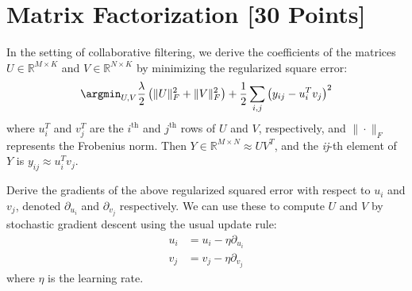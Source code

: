 \newpage
\section{Matrix Factorization [30 Points]}

In the setting of collaborative filtering, we derive the coefficients of the matrices $U \in \mathbb{R}^{M \times K}$ and $V \in \mathbb{R}^{N \times K}$ by minimizing the regularized square error:
$$\argmin_{U,V} \frac{\lambda}{2} \left( \|U\|_F^2 + \|V\|^2_F \right) + \frac{1}{2}\sum_{i,j} \left( y_{ij} - u_i^Tv_j\right)^2$$
where $u_i^T$ and $v_j^T$ are the $i^{\text{th}}$ and $j^{\text{th}}$ rows of $U$ and $V$, respectively, and $\|\cdot\|_F$ represents the Frobenius norm. Then $Y \in \mathbb{R}^{M \times N} \approx UV^T$, and the \textit{ij}-th element of $Y$ is $y_{ij} \approx u_i^Tv_j$.

\problem[5]Derive the gradients of the above regularized squared error with respect to $u_i$ and $v_j$, denoted $\partial_{u_i}$ and $\partial_{v_j}$ respectively.  We can use these to compute $U$ and $V$ by stochastic gradient descent using the usual update rule: 
\begin{align*}
u_i &= u_i - \eta \partial_{u_i} \\
v_j &= v_j - \eta \partial_{v_j}
\end{align*}
where $\eta$ is the learning rate.

